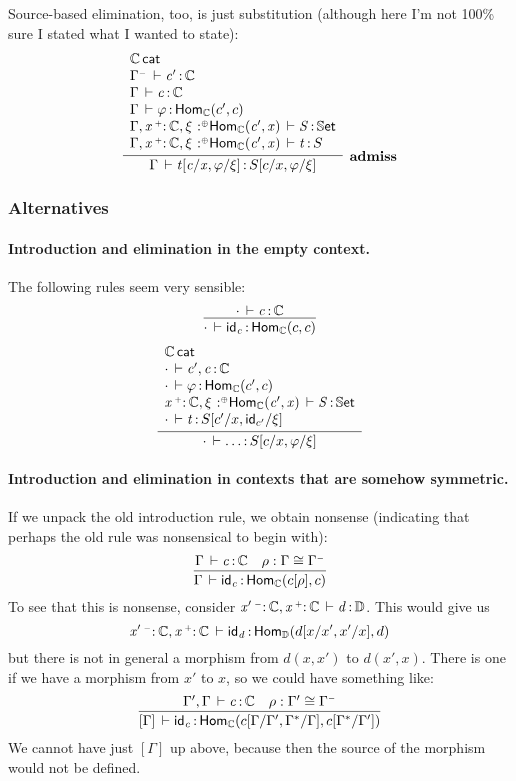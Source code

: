\documentclass[11pt]{article}
\theoremstyle{plain}
\begin{document}
Source-based elimination, too, is just substitution (although here I'm not 100\% sure I stated what I wanted to state):
\begin{equation}
	\infer[\admiss]{
		\oftp{\Gamma}{t[c/x, \vfi/\xi]}{S[c/x, \vfi/\xi]}
	}{ \begin{array}{l}
		\wfdtp{\C} \\
		\oftp{\Gamma^\con}{c'}{\C} \\
		\oftp{\Gamma}{c}{\C} \\
		\oftp{\Gamma}{\vfi}{\Hom{\C}{c'}{c}} \\
		\oftp{\Gamma, \catvar{x}{\co}{\C}, \tpvar{\xi}{\coc}{\Hom{\C}{c'}{x}} }{S}{\types} \\
		\oftp{\Gamma, \catvar{x}{\co}{\C}, \tpvar{\xi}{\coc}{\Hom{\C}{c'}{x}} }{t}{S}
	\end{array} }
\end{equation}

\subsubsection{Alternatives}
\paragraph{Introduction and elimination in the empty context.}
The following rules seem very sensible:
\[
	\infer{
		\oftp{\cdot}{\idm c}{\Hom{\C}{c}{c}}
	}{
		\oftp{\cdot}{c}{\C}
	}
\]
\begin{equation}
	\infer{
		\oftp{\cdot}{\ldots}{S[c/x, \vfi/\xi]}
	}{ \begin{array}{l}
		\wfdtp{\C} \\
		\oftp{\cdot}{c', c}{\C} \\
		\oftp{\cdot}{\vfi}{\Hom{\C}{c'}{c}} \\
		\oftp{\catvar{x}{\co}{\C}, \tpvar{\xi}{\coc}{\Hom{\C}{c'}{x}} }{S}{\types} \\
		\oftp{\cdot}{t}{S[c'/x, \idm{c'}/\xi]}
	\end{array} }
\end{equation}

\paragraph{Introduction and elimination in contexts that are somehow symmetric.}
If we unpack the old introduction rule, we obtain nonsense (indicating that perhaps the old rule was nonsensical to begin with):
\[
	\infer{
		\oftp{\Gamma}{\idm c}{\Hom{\C}{c[\rho]}{c}}
	}{
		\oftp{\Gamma}{c}{\C} &
		\rho : \Gamma \cong \Gamma^\con
	}
\]
To see that this is nonsense, consider ${\mathit{x'} \,^{{\text{\tiny $\mathord{-}$}}}{:}^{\,} \mathit{\mathbb{C}}, \mathit{x} \,^{{\text{\tiny $\mathord{+}$}}}{:}^{\,} \mathit{\mathbb{C}}} \, \vdash \mathit{d} \, \mathit{:} \, \mathbb{D}$. This would give us
\[
	{\mathit{x'} \,^{{\text{\tiny $\mathord{-}$}}}{:}^{\,} \mathit{\mathbb{C}}, \mathit{x} \,^{{\text{\tiny $\mathord{+}$}}}{:}^{\,} \mathit{\mathbb{C}}} \, \vdash \mathit{\mathsf{id}_{d}} \, \mathit{:} \, \mathsf{Hom}_{\mathbb{D}}(d[x/x', x'/x],d)
\]
but there is not in general a morphism from $d(x, x')$ to $d(x', x)$. There is one if we have a morphism from $x'$ to $x$, so we could have something like:
\[
	\infer{
		\oftp{[\Gamma]}{\idm c}{\Hom{\C}{c[\Gamma/\Gamma', \Gamma^*/\Gamma]}{c[\Gamma^*/\Gamma']}}
	}{
		\oftp{\Gamma', \Gamma}{c}{\C} &
		\rho : \Gamma' \cong \Gamma^\con
	}
\]
We cannot have just $[\Gamma]$ up above, because then the source of the morphism would not be defined.
\end{document}
